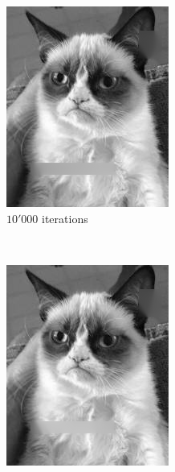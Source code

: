 \documentclass{paper}
\begin{document}
\begin{figure}[ht]
\begin{subfigure}[h]{0.3\textwidth}
	\includegraphics[width=\textwidth]{cat-iter10000-lambda1000-alpha0_0005}
	\caption*{$10'000$ iterations}
\end{subfigure}
~
\begin{subfigure}[h]{0.3\textwidth}
	\centering
	\includegraphics[width=\textwidth]{cat-iter50000-lambda1000-alpha0_0005}

\end{subfigure}
\end{figure}
\end{document}
